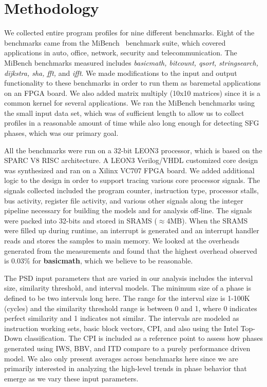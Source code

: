 \section{Methodology}

We collected entire program profiles for nine different benchmarks. Eight of the benchmarks came from the MiBench~\cite{Guthaus:2001:MFC} benchmark suite, which covered applications in auto, office, network, security and telecommunication. The MiBench benchmarks measured includes \emph{basicmath, bitcount, qsort, stringsearch, dijkstra, sha, fft,} and \emph{ifft}. We made modifications to the input and output functionality to these benchmarks in order to run them as baremetal applications on an FPGA board. We also added matrix multiply (10x10 matrices) since it is a common kernel for several applications. We ran the MiBench benchmarks using the small input data set, which was of sufficient length to allow us to collect profiles in a reasonable amount of time while also long enough for detecting SFG phases, which was our primary goal.

All the benchmarks were run on a 32-bit LEON3 processor, which is based on the SPARC V8 RISC architecture. A LEON3 Verilog/VHDL customized core design was synthesized and ran on a Xilinx VC707 FPGA board. We added additional logic to the design in order to support tracing various core processor signals. The signals collected included the program counter, instruction type, processor stalls, bus activity, register file activity, and various other signals along the integer pipeline necessary for building the models and for analysis off-line. The signals were packed into 32-bits and stored in SRAMS ($\approx$4MB). When the SRAMS were filled up during runtime, an interrupt is generated and an interrupt handler reads and stores the samples to main memory. We looked at the overheads generated from the measurements and found that the highest overhead observed is 0.03\% for \textbf{basicmath}, which we believe to be reasonable. 

The PSD input parameters that are varied in our analysis includes the interval size, similarity threshold, and interval models. The minimum size of a phase is defined to be two intervals long here. The range for the interval size is 1-100K (cycles) and the similarity threshold range is between 0 and 1, where 0 indicates perfect similarity and 1 indicates not similar. The intervals are modeled as instruction working sets, basic block vectors, CPI, and also using the Intel Top-Down classification. The CPI is included as a reference point to assess how phases generated using IWS, BBV, and ITD compare to a purely performance driven model. We also only present averages across benchmarks here since we are primarily interested in analyzing the high-level trends in phase behavior that emerge as we vary these input parameters.

